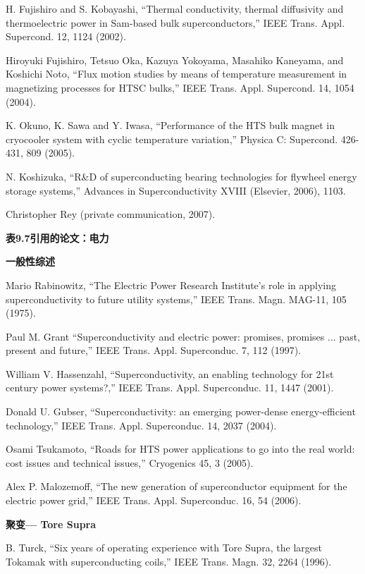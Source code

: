 \noindent [9.19] H. Fujishiro and S. Kobayashi, ``Thermal conductivity, thermal diffusivity and thermoelectric power in Sam-based bulk superconductors,” IEEE Trans. Appl. Supercond. 12, 1124 (2002).

\noindent [9.20] Hiroyuki Fujishiro, Tetsuo Oka, Kazuya Yokoyama, Masahiko Kaneyama, and Koshichi Noto, ``Flux motion studies by means of temperature measurement in magnetizing processes for HTSC bulks,” IEEE Trans. Appl. Supercond. 14, 1054 (2004).

\noindent [9.21] K. Okuno, K. Sawa and Y. Iwasa, ``Performance of the HTS bulk magnet in cryocooler system with cyclic temperature variation,” Physica C: Supercond. 426-431, 809 (2005).

\noindent [9.22] N. Koshizuka, ``R\&D of superconducting bearing technologies for flywheel energy storage systems,” Advances in Superconductivity XVIII (Elsevier, 2006), 1103.

\noindent [9.23] Christopher Rey (private communication, 2007).

\noindent \textbf{表9.7引用的论文：电力}

\noindent \textbf{一般性综述}

\noindent [9.24] Mario Rabinowitz, ``The Electric Power Research Institute’s role in applying superconductivity
to future utility systems,” IEEE Trans. Magn. MAG-11, 105 (1975).

\noindent [9.25] Paul M. Grant ``Superconductivity and electric power: promises, promises ... past,
present and future,” IEEE Trans. Appl. Superconduc. 7, 112 (1997).

\noindent [9.26] William V. Hassenzahl, ``Superconductivity, an enabling technology for 21st century
power systems?,” IEEE Trans. Appl. Superconduc. 11, 1447 (2001).

\noindent [9.27] Donald U. Gubser, ``Superconductivity: an emerging power-dense energy-efficient
technology,” IEEE Trans. Appl. Superconduc. 14, 2037 (2004).

\noindent [9.28] Osami Tsukamoto, ``Roads for HTS power applications to go into the real world:
cost issues and technical issues,” Cryogenics 45, 3 (2005).

\noindent [9.29] Alex P. Malozemoff, ``The new generation of superconductor equipment for the
electric power grid,” IEEE Trans. Appl. Superconduc. 16, 54 (2006).

\noindent \textbf{聚变--- Tore Supra }

\noindent [9.30] B. Turck, ``Six years of operating experience with Tore Supra, the largest Tokamak
with superconducting coils,” IEEE Trans. Magn. 32, 2264 (1996).


